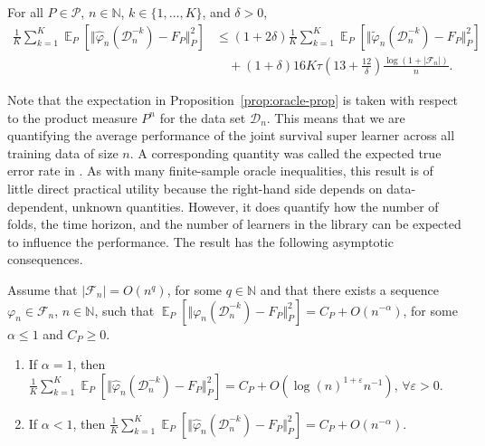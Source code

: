 \documentclass[lineno]{biometrika}
\DeclareMathOperator{\E}{\mathbb{E}} %
\newcommand{\N}{\mathbb{N}}
\renewcommand{\phi}{\varphi}
\renewcommand{\epsilon}{\varepsilon}
\newcommand\bigO{\textit{O}}
\newcommand{\1}{\mathds{1}}
\newcommand{\data}{\ensuremath{\mathcal{D}}}
\begin{document}
\begin{proposition}
  \label{prop:oracle-prop}
  For all \(P\in\mathcal{P}\), \( n \in \N \), \( k \in \{1, \dots, K\} \),
  and $\delta>0$,
  \begin{align*}
    \frac{1}{K}\sum_{k=1}^{K} \E_{P}{\left[ \Vert \hat{\phi}_n(\data_n^{-k}) - F_P \Vert_{P}^2 \right]}
    & \leq (1 + 2\delta)
      \frac{1}{K}\sum_{k=1}^{K} \E_{P}{\left[ \Vert \tilde{\phi}_n(\data_n^{-k}) - F_P \Vert_{P}^2 \right]}
    \\
    & \quad
      + (1+ \delta) 16   K \tau
      \left(
      13 + \frac{12}{\delta}
      \right)
      \frac{\log(1 + |\mathcal{F}_n|)}{n}.
  \end{align*}
\end{proposition}

Note that the expectation in Proposition~\ref{prop:oracle-prop} is
taken with respect to the product measure \( P^{n} \) for the data set
\( \data_n \). This means that we are quantifying the average
performance of the joint survival super learner across all training
data of size \(n\). A corresponding quantity was called the expected
true error rate in \cite{efron_and_tibshirani97}. As with many
finite-sample oracle inequalities, this result is of little direct
practical utility because the right-hand side depends on
data-dependent, unknown quantities. However, it does quantify how the
number of folds, the time horizon, and the number of learners in the
library can be expected to influence the performance. The result has
the following asymptotic consequences.

\begin{corollary}
  \label{cor:asymp-cons}
  Assume that \( |\mathcal{F}_n| = \bigO(n^q)\), for some
  \( q \in \N \) and that there exists a sequence
  \( \phi_n \in \mathcal{F}_n \), \( n \in \N \), such that
  \(  \E_{P}{\left[ \Vert
      \phi_n(\data_n^{-k}) - F_P \Vert_{P}^2 \right]} = C_P +
  \bigO(n^{-\alpha}) \), for some \( \alpha\leq 1 \) and
  \( C_P \geq 0 \).
  \begin{enumerate}[label=(\alph*)]
  \item\label{item:1} If $\alpha=1$, then
    \(\frac{1}{K}\sum_{k=1}^{K} \E_{P}{\left[ \Vert
        \hat{\phi}_n(\data_n^{-k}) - F_P \Vert_{P}^2 \right]} = C_P +
    \bigO(\log(n)^{1+\epsilon}n^{-1}) \), $\forall\epsilon>0$.
  \item\label{item:2} If $\alpha<1$, then
    \(\frac{1}{K}\sum_{k=1}^{K} \E_{P}{\left[ \Vert
        \hat{\phi}_n(\data_n^{-k}) - F_P \Vert_{P}^2 \right]} = C_P +
    \bigO(n^{-\alpha}) \).
  \end{enumerate}
\end{corollary}
\end{document}
